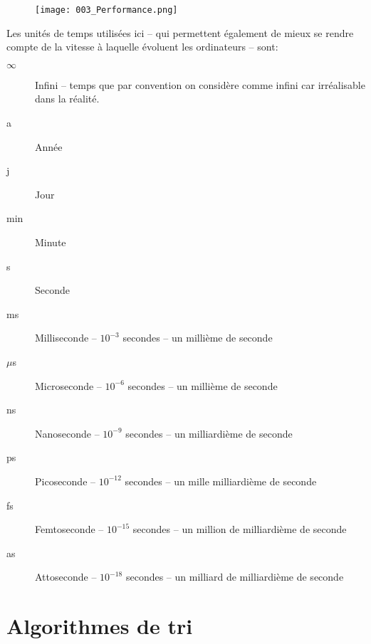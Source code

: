 \documentclass[12pt]{article}
\begin{document}
	\begin{figure}[H]
		\centering
		\texttt{[image: 003\_Performance.png]}
	\end{figure}
	
	Les unités de temps utilisées ici  -- qui permettent également de mieux se rendre compte de la vitesse à laquelle évoluent les ordinateurs -- sont:
	\begin{description}
		\item[$\infty$] Infini -- temps que par convention on considère comme infini car irréalisable dans la réalité.
		\item[a] Année
		\item[j] Jour
		\item[min] Minute
		\item[s] Seconde
		\item [ms] Milliseconde -- $10^{-3}$ secondes -- un millième de seconde
		\item[$\mu$s] Microseconde -- $10^{-6}$ secondes -- un millième de seconde
		\item[ns] Nanoseconde -- $10^{-9}$ secondes -- un milliardième de seconde
		\item[ps] Picoseconde -- $10^{-12}$ secondes -- un mille milliardième de seconde
		\item[fs] Femtoseconde -- $10^{-15}$ secondes -- un million de milliardième de seconde
		\item[as] Attoseconde -- $10^{-18}$ secondes -- un milliard de milliardième de seconde
	\end{description}
	\pagebreak
	\section{Algorithmes de tri}
	
\end{document}
